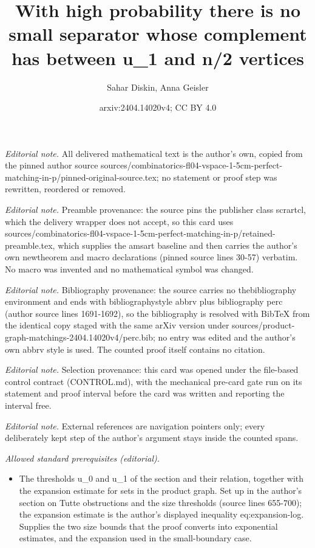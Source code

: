 \documentclass[10pt,a4paper]{amsart}
\title{With high probability there is no small separator whose complement has between u\_1 and n/2 vertices}
\author{Sahar Diskin, Anna Geisler}
\date{arxiv:2404.14020v4; CC BY 4.0}
\begin{document}
\maketitle
\noindent\textit{Editorial note.} All delivered mathematical text is the author's own, copied from the pinned author source sources/combinatorics-fl04-vspace-1-5cm-perfect-matching-in-p/pinned-original-source.tex; no statement or proof step was rewritten, reordered or removed.\par\medskip
\noindent\textit{Editorial note.} Preamble provenance: the source pins the publisher class scrartcl, which the delivery wrapper does not accept, so this card uses sources/combinatorics-fl04-vspace-1-5cm-perfect-matching-in-p/retained-preamble.tex, which supplies the amsart baseline and then carries the author's own newtheorem and macro declarations (pinned source lines 30-57) verbatim. No macro was invented and no mathematical symbol was changed.\par\medskip
\noindent\textit{Editorial note.} Bibliography provenance: the source carries no thebibliography environment and ends with bibliographystyle abbrv plus bibliography perc (author source lines 1691-1692), so the bibliography is resolved with BibTeX from the identical copy staged with the same arXiv version under sources/product-graph-matchings-2404.14020v4/perc.bib; no entry was edited and the author's own abbrv style is used. The counted proof itself contains no citation.\par\medskip
\noindent\textit{Editorial note.} Selection provenance: this card was opened under the file-based control contract (CONTROL.md), with the mechanical pre-card gate run on its statement and proof interval before the card was written and reporting the interval free.\par\medskip
\noindent\textit{Editorial note.} External references are navigation pointers only; every deliberately kept step of the author's argument stays inside the counted spans.\par\medskip
\noindent\textit{Allowed standard prerequisites (editorial).}\begin{itemize}
\item The thresholds u\_0 and u\_1 of the section and their relation, together with the expansion estimate for sets in the product graph. Set up in the author's section on Tutte obstructions and the size thresholds (source lines 655-700); the expansion estimate is the author's displayed inequality eq:expansion-log. Supplies the two size bounds that the proof converts into exponential estimates, and the expansion used in the small-boundary case.
\end{itemize}\medskip
\end{document}
